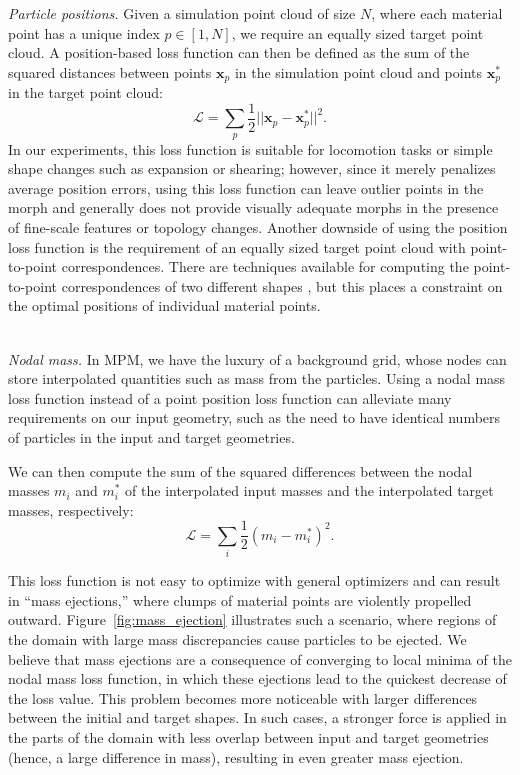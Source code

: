     \textit{Particle positions.} Given a simulation point cloud of size $N$, where
    each material point has a unique index $p \in [1, N]$, we require an
    equally sized target point cloud. A position-based loss function can then be defined as
    the sum of the squared distances between points $\mathbf{x}_p$ in the simulation
    point cloud and points $\mathbf{x}^*_p$ in the target point cloud:
    \begin{equation}
        \mathcal{L} = \sum_p \frac{1}{2}||\mathbf{x}_p - \mathbf{x}_p^*||^2 .
    \end{equation}
    In our experiments, this loss function is suitable for locomotion tasks or simple shape changes such as expansion or shearing;
    however, since it merely penalizes average position errors, using this loss function can leave outlier points in the morph and generally does not provide visually adequate morphs in the presence of fine-scale features or topology changes. 
    Another downside of using the position loss function is the requirement of an equally sized target point cloud with point-to-point correspondences.
    There are techniques available for computing the point-to-point correspondences of two different shapes \citep{2011-ShapeCorrespondenceSurvey}, but this places a constraint on the optimal positions of individual material points.

    \noindent \\ \textit{Nodal mass.}
    In {MPM}, we have the luxury of a background grid, whose nodes can store interpolated quantities such as mass from the particles.
    Using a nodal mass loss function instead of a point position loss function can alleviate many requirements on our input geometry, such as the need to have identical numbers of particles in the input and target geometries.
    
    We can then compute the sum of the squared differences between the nodal masses $m_i$ and $m_i^*$ of the interpolated input masses and the interpolated target masses, respectively:
    \begin{equation}
        \mathcal{L} = \sum_{i} \frac{1}{2} (m_i - m^*_i)^2 .
    \end{equation}
    
    This loss function is not easy to optimize with general optimizers and can result in ``mass ejections,'' where clumps of material points are violently propelled outward.
    Figure~\ref{fig:mass_ejection} illustrates such a scenario, where regions of the domain with large mass discrepancies cause particles to be ejected. 
    We believe that mass ejections are a consequence of converging to local minima of the nodal mass loss function, in which these ejections lead to the quickest decrease of the loss value.
    This problem becomes more noticeable with larger differences between the initial and target shapes.
    In such cases, a stronger force is applied in the parts of the domain with less overlap between input and target geometries (hence, a large difference in mass), resulting in even greater mass ejection.
    
